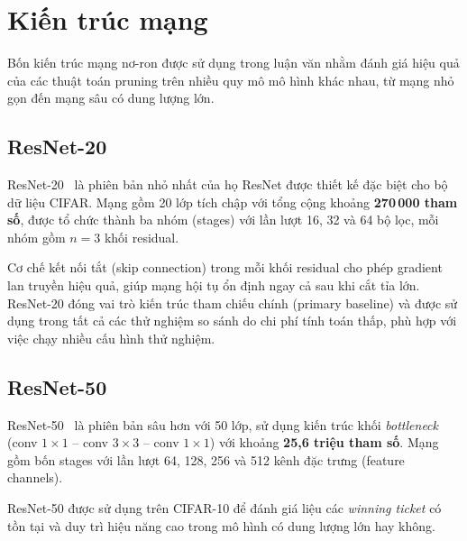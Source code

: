     \section{Kiến trúc mạng}
    Bốn kiến trúc mạng nơ-ron được sử dụng trong luận văn nhằm đánh giá
hiệu quả của các thuật toán pruning trên nhiều quy mô mô hình khác nhau,
từ mạng nhỏ gọn đến mạng sâu có dung lượng lớn.
 
    \subsection{ResNet-20}
    \label{subsec:resnet20}
     
    ResNet-20~\cite{he2016deep} là phiên bản nhỏ nhất của họ ResNet được thiết kế
    đặc biệt cho bộ dữ liệu CIFAR.
    Mạng gồm 20 lớp tích chập với tổng cộng khoảng \textbf{270\,000 tham số},
    được tổ chức thành ba nhóm (stages) với lần lượt 16, 32 và 64 bộ lọc,
    mỗi nhóm gồm $n=3$ khối residual.
     
    Cơ chế kết nối tắt (skip connection) trong mỗi khối residual cho phép
    gradient lan truyền hiệu quả, giúp mạng hội tụ ổn định ngay cả sau khi
    cắt tỉa lớn.
    ResNet-20 đóng vai trò kiến trúc tham chiếu chính (primary baseline) và
    được sử dụng trong tất cả các thử nghiệm so sánh do chi phí tính toán thấp,
    phù hợp với việc chạy nhiều cấu hình thử nghiệm.
     
    \subsection{ResNet-50}
    \label{subsec:resnet50}
     
    ResNet-50~\cite{he2016deep} là phiên bản sâu hơn với 50 lớp, sử dụng
    kiến trúc khối \textit{bottleneck} (conv $1\times1$ -- conv $3\times3$ -- conv $1\times1$)
    với khoảng \textbf{25,6 triệu tham số}.
    Mạng gồm bốn stages với lần lượt 64, 128, 256 và 512 kênh đặc trưng
    (feature channels).
     
    ResNet-50 được sử dụng trên CIFAR-10 để đánh giá liệu các \textit{winning
    ticket} có tồn tại và duy trì hiệu năng cao trong mô hình có dung lượng lớn
    hay không.

        
